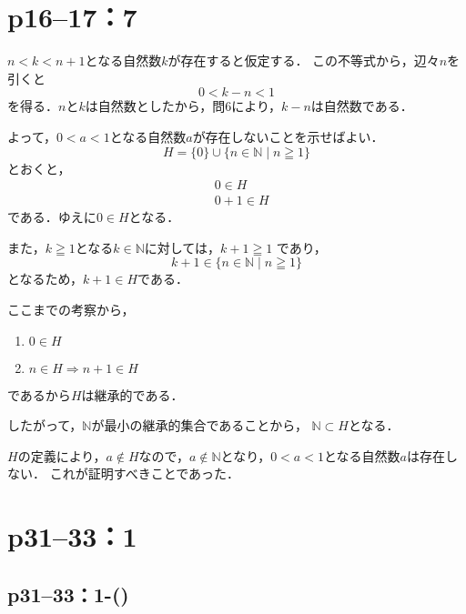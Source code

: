 \section*{p16--17：7}

\begin{tproof}
    $n < k < n+1$となる自然数$k$が存在すると仮定する．
    この不等式から，辺々$n$を引くと
    \[
        0 < k - n < 1
    \]
    を得る．$n$と$k$は自然数としたから，問6により，$k-n$は自然数である．

    よって，$0<a<1$となる自然数$a$が存在しないことを示せばよい．
    \[
        H=\{0\} \cup \{n \in \mathbb{N} \mid n \geqq 1 \}
    \]
    とおくと，
    \begin{align*}
         & 0 \in H   \\
         & 0+1 \in H
    \end{align*}
    である．ゆえに$ 0 \in H$となる．

    また，$k \geqq 1$となる$k \in \mathbb{N}$に対しては，$k +1 \geqq 1$
    であり，
    \[
        k+1 \in \{n \in \mathbb{N} \mid n \geqq 1 \}
    \]
    となるため，$k+1 \in H$である．

    ここまでの考察から，
    \begin{enumerate}
        \item $0 \in H$
        \item $n \in H \Longrightarrow n+1 \in H$
    \end{enumerate}
    であるから$H$は継承的である．

    したがって，$\mathbb{N}$が最小の継承的集合であることから，
    $\mathbb{N} \subset H$となる．

    $H$の定義により，$a \notin H$なので，$a \notin \mathbb{N}$となり，$0<a<1$となる自然数$a$は存在しない．
    これが証明すべきことであった．
\end{tproof}



\section*{p31--33：1}


\subsection*{p31--33：1-()}

